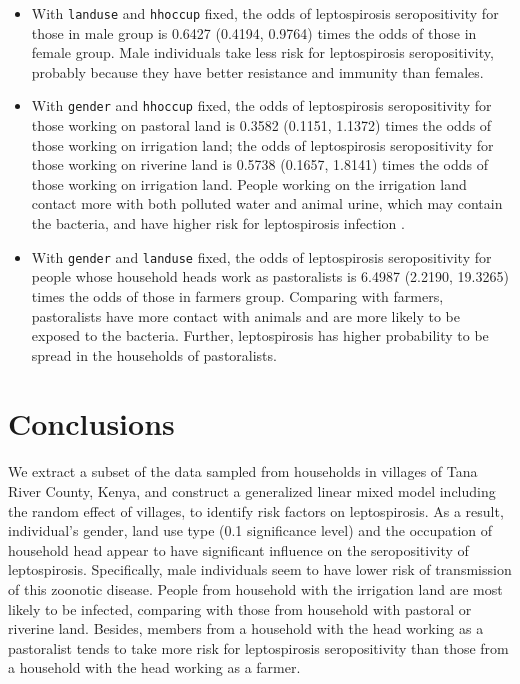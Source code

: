 \documentclass[11pt,twoside]{article}
\numberwithin{Theorem}{section}
\numberwithin{Definition}{section}
\numberwithin{Lemma}{section}
\numberwithin{Algorithm}{section}
\numberwithin{equation}{section}
\begin{document}
\begin{itemize}
	\item With \texttt{landuse} and \texttt{hhoccup} fixed, the odds of leptospirosis seropositivity for those in male group is 0.6427 (0.4194, 0.9764) times the odds of those in female group. Male individuals take less risk for leptospirosis seropositivity, probably because they have better resistance and immunity than females.
	
	\item With \texttt{gender} and \texttt{hhoccup} fixed, the odds of leptospirosis seropositivity for those working on pastoral land is 0.3582 (0.1151, 1.1372) times the odds of those working on irrigation land; the odds of leptospirosis seropositivity for those working on riverine land is 0.5738 (0.1657, 1.8141) times the odds of those working on irrigation land. People working on the irrigation land contact more with both polluted water and animal urine, which may contain the bacteria, and have higher risk for leptospirosis infection \cite{farr1995leptospirosis}. 
	
	\item With \texttt{gender} and \texttt{landuse} fixed, the odds of leptospirosis seropositivity for people whose household heads work as pastoralists is 6.4987 (2.2190, 19.3265) times the odds of those in farmers group. Comparing with farmers, pastoralists have more contact with animals and are more likely to be exposed to the bacteria. Further, leptospirosis has higher probability to be spread in the households of pastoralists. 
	
\end{itemize}

\clearpage

\section{Conclusions}

We extract a subset of the data sampled from households in villages of Tana River County, Kenya, and construct a generalized linear mixed model including the random effect of villages, to identify risk factors on leptospirosis. As a result, individual's gender, land use type (0.1 significance level) and the occupation of household head appear to have significant influence on the seropositivity of leptospirosis. Specifically, male individuals seem to have lower risk of transmission of this zoonotic disease. People from household with the irrigation land are most likely to be infected, comparing with those from household with pastoral or riverine land. Besides, members from a household with the head working as a pastoralist tends to take more risk for leptospirosis seropositivity than those from a household with the head working as a farmer.
\end{document}
